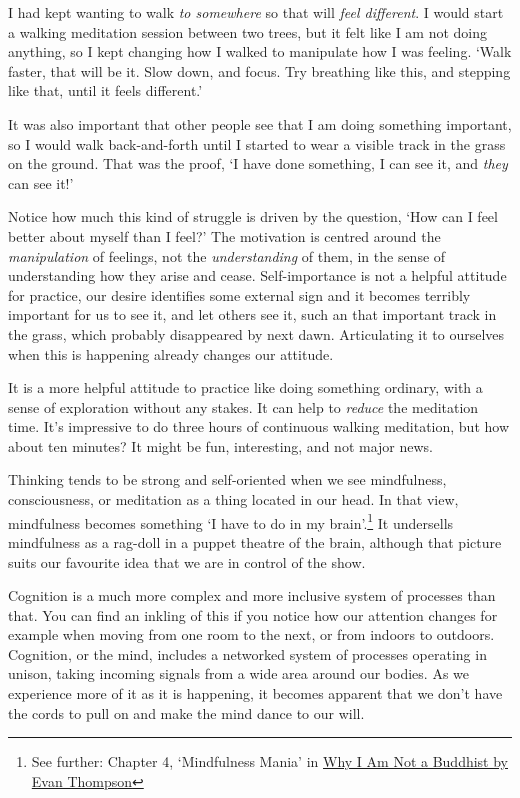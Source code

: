 I had kept wanting to walk \emph{to somewhere} so that will \emph{feel
different}. I would start a walking meditation session between two
trees, but it felt like I am not doing anything, so I kept changing how
I walked to manipulate how I was feeling. `Walk faster, that will be it.
Slow down, and focus. Try breathing like this, and stepping like that,
until it feels different.'

It was also important that other people see that I am doing something
important, so I would walk back-and-forth until I started to wear a
visible track in the grass on the ground. That was the proof, `I have
done something, I can see it, and \emph{they} can see it!'

Notice how much this kind of struggle is driven by the question, `How
can I feel better about myself than I feel?' The motivation is centred
around the \emph{manipulation} of feelings, not the \emph{understanding}
of them, in the sense of understanding how they arise and cease.
Self-importance is not a helpful attitude for practice, our desire
identifies some external sign and it becomes terribly important for us
to see it, and let others see it, such an that important track in the
grass, which probably disappeared by next dawn. Articulating it to
ourselves when this is happening already changes our attitude.

It is a more helpful attitude to practice like doing something ordinary,
with a sense of exploration without any stakes. It can help to
\emph{reduce} the meditation time. It's impressive to do three hours of
continuous walking meditation, but how about ten minutes? It might be
fun, interesting, and not major news.

Thinking tends to be strong and self-oriented when we see mindfulness,
consciousness, or meditation as a thing located in our head. In that
view, mindfulness becomes something `I have to do in my
brain'.\footnote{See further: Chapter 4, `Mindfulness Mania' in
  \href{https://www.goodreads.com/book/show/44439993-why-i-am-not-a-buddhist}{Why
  I Am Not a Buddhist by Evan Thompson}} It undersells mindfulness as a
rag-doll in a puppet theatre of the brain, although that picture suits
our favourite idea that we are in control of the show.

Cognition is a much more complex and more inclusive system of processes
than that. You can find an inkling of this if you notice how our
attention changes for example when moving from one room to the next, or
from indoors to outdoors. Cognition, or the mind, includes a networked
system of processes operating in unison, taking incoming signals from a
wide area around our bodies. As we experience more of it as it is
happening, it becomes apparent that we don't have the cords to pull on
and make the mind dance to our will.

